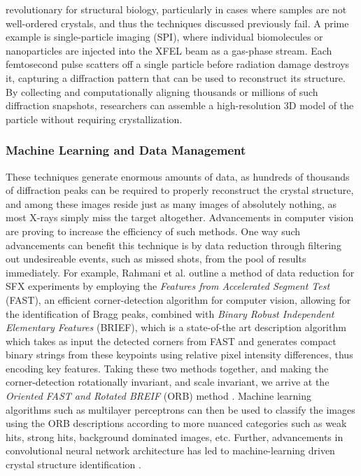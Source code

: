 \documentclass[aps,prb,twocolumn,superscriptaddress]{revtex4-2}
\begin{document}
revolutionary for structural biology, particularly in cases where samples are
not well-ordered crystals, and thus the techniques discussed previously fail. A
prime example is single-particle imaging (SPI), where individual biomolecules
or nanoparticles are injected into the XFEL beam as a gas-phase stream. Each
femtosecond pulse scatters off a single particle before radiation damage
destroys it, capturing a diffraction pattern that can be used to reconstruct
its structure. By collecting and computationally aligning thousands or millions
of such diffraction snapshots, researchers can assemble a high-resolution 3D
model of the particle without requiring crystallization.



\subsubsection{Machine Learning and Data Management}
These techniques generate enormous amounts of data, as hundreds of thousands of
diffraction peaks can be required to properly reconstruct the crystal
structure, and among these images reside just as many images of absolutely
nothing, as most X-rays simply miss the target altogether. Advancements in
computer vision are proving to increase the efficiency of
such methods. One way such advancements can benefit this technique is by data
reduction through filtering out undesireable events, such as missed shots, from
the pool of results immediately. For example, Rahmani et al. outline a method
of data reduction for SFX experiments by employing the \textit{Features from
Accelerated Segment Test} (FAST), an efficient corner-detection algorithm
for computer vision, allowing for the identification of Bragg peaks,
combined with \textit{Binary Robust Independent Elementary Features}
(BRIEF), which is a state-of-the art description algorithm which takes as
input the detected corners from FAST and generates compact binary strings
from these keypoints using relative pixel intensity differences, thus
encoding key features. Taking these two methods together, and making the
corner-detection rotationally invariant, and scale invariant, we arrive at
the \textit{Oriented FAST and Rotated BREIF} (ORB) method
\cite{Rahmani2023}. Machine learning algorithms such as multilayer perceptrons 
can then be used to classify the images using the ORB descriptions according to
more nuanced categories such as weak hits, strong hits, background dominated
images, etc. Further, advancements in convolutional neural network architecture
has led to machine-learning driven crystal structure identification 
\cite{ziletti2018insightful}.
\end{document}
